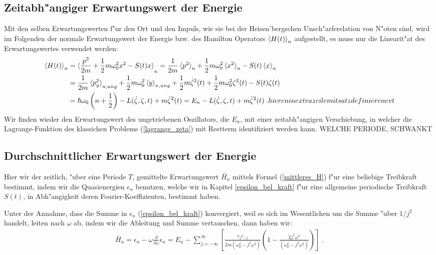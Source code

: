   \subsection{Zeitabh"angiger Erwartungswert der Energie}
    Mit den selben Erwartungswerten f"ur den Ort und den Impuls, wie sie bei der Heisen'bergschen Unsch"arferelation von N"oten sind, wird im Folgenden der normale Erwartungswert der Energie bzw. des Hamilton Operators $\braket{H(t)}_n$ aufgestellt, es muss nur die Linearit"at des Erwartungswertes verwendet werden:
    \begin{align}
      \braket{H(t)}_n &= \braket{\frac{p^2}{2m} + \frac{1}{2}m\omega_0^2x^2 - S(t)x}_n
      =\frac{1}{2m}\braket{p^2}_n + \frac{1}{2}m\omega_0^2\braket{x^2}_n - S(t)\braket{x}_n \notag\\
      &= \frac{1}{2m}\braket{p^2_y}_{n,ung} + \frac{1}{2}m\omega_0^2\braket{y}_{n,ung} + \frac{1}{2}m\dot{\zeta}^2(t) + \frac{1}{2}m\omega_0^2\zeta^2(t) - S(t)\zeta(t) \notag\\
      &= \hbar\omega_0\left(n+\frac{1}{2}\right) - L(\dot{\zeta},\zeta,t) + m\dot{\zeta}^2(t) = E_n - L(\dot{\zeta},\zeta,t) + m\dot{\zeta}^2(t) \; .
      hier en in extra zeile mit satz definieren evt
    \end{align}
    Wir finden wieder den Erwartungswert des ungetriebenen Oszillators, die $E_n$, mit einer zeitabh"angigen Verschiebung, in welcher die Lagrange-Funktion des klassichen Problems (\ref{lagrange_zeta}) mit Restterm identifiziert werden kann.
    WELCHE PERIODE, SCHWANKT

  \subsection{Durchschnittlicher Erwartungswert der Energie}
    Hier wir der zeitlich, "uber eine Periode $T$, gemittelte Erwartungswert $\bar H_n$ mittels Formel (\ref{mittleres_H}) f"ur eine beliebige Treibkraft bestimmt, indem wir die Quasienergien $\epsilon_n$ benutzen, welche wir in Kapitel \ref{epsilon_bel_kraft} f"ur eine allgemeine periodische Treibkraft $S(t)$, in Abh"angigkeit deren Fourier-Koeffizienten, bestimmt haben.

    Unter der Annahme, dass die Summe in $\epsilon_n$ (\ref{epsilon_bel_kraft}) konvergiert, weil es sich im Wesentlichen um die Summe "uber $1/j^2$ handelt, leiten nach $\omega$ ab, indem wir die Ableitung und Summe vertauschen, dann haben wir:
    \begin{align}
      \bar H_n = \epsilon_n - \omega\frac{\partial}{\partial \omega}\epsilon_n
      = E_n - \sum_{j=-\infty}^{\infty} \left[ \frac{c_jc_{-j}}{2m(\omega_0^2-j^2\omega^2)}\left( 1-\frac{2j^2\omega^2}{(\omega_0^2-j^2\omega^2)}\right) \right] \; .
    \end{align}

